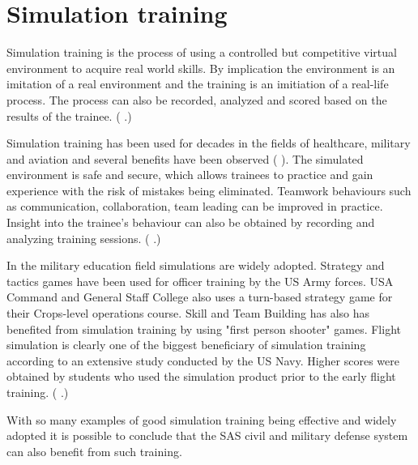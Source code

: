 \documentclass[12pt, a4paper,oneside, nocenter]{thesis}
\renewcommand{\citep}[1]{(\citeauthor{#1} \citeyear{#1}.)}
\newcommand{\citeyeartitlexamkinline}[1]{(\usebibentry{#1}{title} \citeyear{#1})}
\begin{document}
\section{Simulation training}
Simulation training is the process of using a controlled but competitive virtual environment to acquire real world skills. By implication the environment is an imitation of a real environment and the training is an imitiation of a real-life process. The process can also be recorded, analyzed and scored based on the results of the trainee. \citep{enterprise-simulation}
\par
Simulation training has been used for decades in the fields of  healthcare, military and aviation and several benefits have been observed \citeyeartitlexamkinline{simulation-training-history}. The simulated environment is safe and secure, which allows trainees to practice and gain experience with the risk of mistakes being eliminated. Teamwork behaviours such as communication, collaboration, team leading can be improved in practice. Insight into the trainee's behaviour can also be obtained by recording and analyzing training sessions. \citep{medical-sim-training}
\par
In the military education field simulations are widely adopted. Strategy and tactics games have been used for officer training by the US Army forces. USA Command and General Staff College also uses a turn-based strategy game for their Crops-level operations course. Skill and Team Building has also has benefited from simulation training by using "first person shooter" games. Flight simulation is clearly one of the biggest beneficiary of simulation training according to an extensive study conducted by the US Navy. Higher scores were obtained by students who used the simulation product prior to the early flight training. \citep{games-sim-mil}
\par
With so many examples of good simulation training being effective and widely adopted it is possible to conclude that the SAS civil and military defense system can also benefit from such training.
\\
\end{document}
